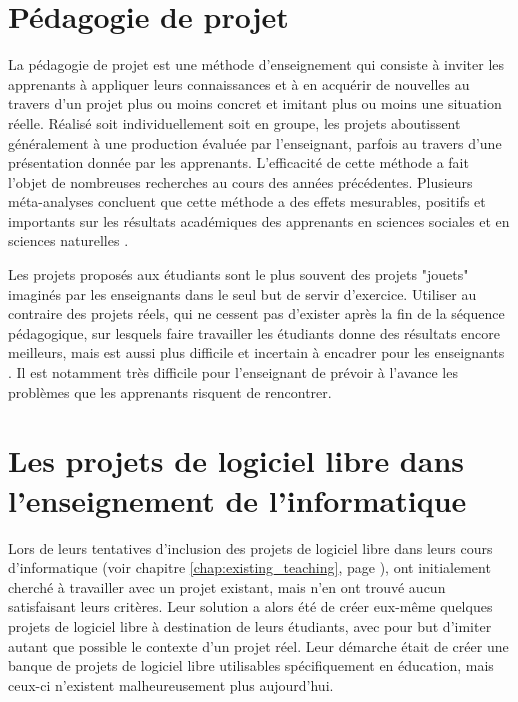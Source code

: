 \section{Pédagogie de projet}

La pédagogie de projet est une méthode d'enseignement qui consiste à inviter les apprenants à appliquer leurs
connaissances et à en acquérir de nouvelles au travers d'un projet plus ou moins concret et imitant plus ou
moins une situation réelle. Réalisé soit individuellement soit en groupe, les projets aboutissent généralement
à une production évaluée par l'enseignant, parfois au travers d'une présentation donnée par les apprenants.
L'efficacité de cette méthode a fait l'objet de nombreuses recherches au cours des années précédentes.
Plusieurs méta-analyses concluent que cette méthode a des effets mesurables, positifs et importants sur les
résultats académiques des apprenants en sciences sociales et en sciences naturelles
.

Les projets proposés aux étudiants sont le plus souvent des projets "jouets" imaginés par les enseignants dans
le seul but de servir d'exercice. Utiliser au contraire des projets réels, qui ne cessent pas d'exister après
la fin de la séquence pédagogique, sur lesquels faire travailler les étudiants donne des résultats encore
meilleurs, mais est aussi plus difficile et incertain à encadrer pour les enseignants
. Il est notamment très difficile pour l'enseignant de prévoir à
l'avance les problèmes que les apprenants risquent de rencontrer.

\section{Les projets de logiciel libre dans l'enseignement de l'informatique}

Lors de leurs tentatives d'inclusion des projets de logiciel libre dans leurs cours d'informatique (voir
chapitre \ref{chap:existing_teaching}, page \pageref{teaching:ncsu}),  ont
initialement cherché à travailler avec un projet existant, mais n'en ont trouvé aucun satisfaisant leurs
critères. Leur solution a alors été de créer eux-même quelques projets de logiciel libre à destination de
leurs étudiants, avec pour but d'imiter autant que possible le contexte d'un projet réel. Leur démarche était
de créer une banque de projets de logiciel libre utilisables spécifiquement en éducation, mais ceux-ci
n'existent malheureusement plus aujourd'hui.

